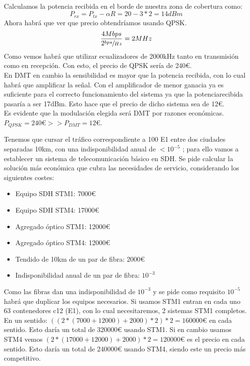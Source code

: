\begin{exercise}[3]
\begin{gather*}
	\end{gather*}
	Calculamos la potencia recibida en el borde de nuestra zona de cobertura como:
	\[P_{rx}=P_{tx}-\alpha R=20-3*2=14dBm\]
	 Ahora habrá que ver que precio obtendríamos usando QPSK.
	\[\frac{4Mbps}{2\sfrac{bps}{Hz}}=2MHz\]
	Como vemos habrá que utilizar ecualizadores de 2000kHz tanto en transmisión como en recepción. Con esto, el precio de QPSK sería de 240€.\\
	En DMT en cambio la sensibilidad es mayor que la potencia recibida, con lo cual habrá que amplificar la señal. Con el amplificador de menor ganacia ya es suficiente para el correcto funcionamiento del sistema ya que la potenciarecibida pasaría a ser 17dBm. Esto hace que el precio de dicho sistema sea de 12€.\\
	Es evidente que la modulación elegida será DMT por razones económicas. $P_{QPSK}=240€> > P_{DMT}=12€$.
\end{exercise}
\begin{exercise}[4]
	Tenemos que cursar el tráfico correspondiente a 100 E1 entre dos ciudades separadas 10km, con una indisponibilidad anual de $<10^{-5}$ ; para ello vamos a establecer un sistema de telecomunicación básico en SDH. Se pide calcular la solución más económica que cubra las necesidades de servicio, considerando los siguientes costes:
	\begin{itemize}
		\item Equipo SDH STM1: 7000€
		\item Equipo SDH STM4: 17000€
		\item Agregado óptico STM1: 12000€
		\item Agregado óptico STM4: 12000€
		\item Tendido de 10km de un par de fibra: 2000€
		\item Indisponibilidad anual de un par de fibra: $10^{-3}$
	\end{itemize}
	Como las fibras dan una indisponibilidad de $10^{-3}$ y se pide como requisito $10^{-5}$ habrá que duplicar los equipos necesarios. Si usamos STM1 entran en cada uno 63 contenedores c12 (E1), con lo cual necesitaremos, 2 sistemas STM1 completos. En un sentido: $((2*(7000+12000)+2000)*2)*2=160000€$ en cada sentido. Esto daría un total de 320000€ usando STM1. Si en cambio usamos STM4 vemos $(2*(17000+12000)+2000)*2=120000€$ es el precio en cada sentido. Esto daría un total de 240000€ usando STM4, siendo este un precio más competitivo.
\end{exercise}
